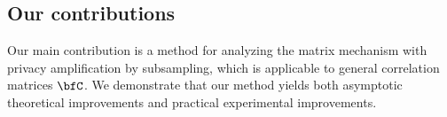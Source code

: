 
\subsection{Our contributions}

Our main contribution is a method for analyzing the matrix mechanism with privacy amplification by subsampling, which is applicable to general correlation matrices $\bfC$. 
We demonstrate that our method yields both asymptotic theoretical improvements and practical experimental improvements.

